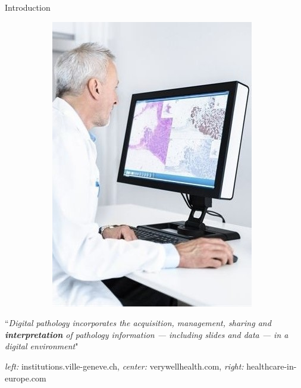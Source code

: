 \documentclass{beamer}
\begin{document}
\begin{frame}{Introduction}
\begin{figure}
\begin{subfigure}{0.27\textwidth}
			\includegraphics[width=\textwidth]{images/dpath_microscope.jpg}
		\end{subfigure}
	\end{figure}
	\begin{center}
	``\textit{Digital pathology incorporates the acquisition, management, sharing and \textbf{interpretation} of pathology information — including slides and data — in a digital environment}" 
	\end{center}
	\hfill
	{\tiny\textit{left:} institutions.ville-geneve.ch, \textit{center:} verywellhealth.com, \textit{right:} healthcare-in-europe.com}
\end{frame}
	
\end{document}
